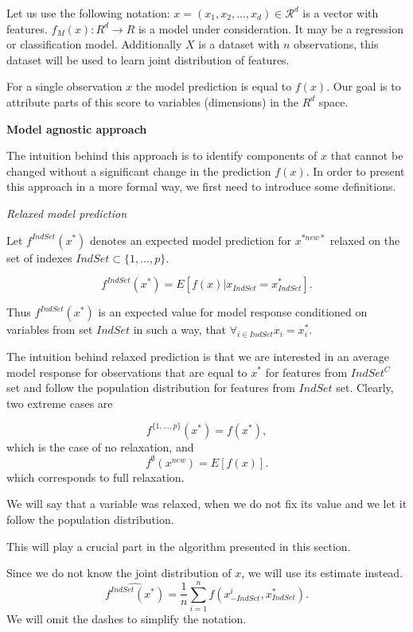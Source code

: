 \documentclass[]{book}
\theoremstyle{definition}
\theoremstyle{definition}
\theoremstyle{definition}
\theoremstyle{remark}
\begin{document}
Let us use the following notation:
\(x = (x_1, x_2, ..., x_d) \in \mathcal R^d\) is a vector with features.
\(f_M(x):R^{d} \rightarrow R\) is a model under consideration. It may be
a regression or classification model. Additionally \(X\) is a dataset
with \(n\) observations, this dataset will be used to learn joint
distribution of features.

For a single observation \(x\) the model prediction is equal to
\(f(x)\). Our goal is to attribute parts of this score to variables
(dimensions) in the \(R^{d}\) space.

\textbf{Model agnostic approach}

The intuition behind this approach is to identify components of \(x\)
that cannot be changed without a significant change in the prediction
\(f(x)\). In order to present this approach in a more formal way, we
first need to introduce some definitions.

\emph{Relaxed model prediction}

Let \(f^{IndSet}(x^{*})\) denotes an expected model prediction for
\(x^{*new*}\) relaxed on the set of indexes
\(IndSet \subset \{1, \ldots, p\}\).

\[
f^{IndSet}(x^{*}) = E[f(x)|x_{IndSet} = x^{*}_{IndSet}].
\]

Thus \(f^{IndSet}(x^{*})\) is an expected value for model response
conditioned on variables from set \(IndSet\) in such a way, that
\(\forall_{i\in IndSet} x_i = x^{*}_i\).

The intuition behind relaxed prediction is that we are interested in an
average model response for observations that are equal to \(x^{*}\) for
features from \(IndSet^C\) set and follow the population distribution
for features from \(IndSet\) set. Clearly, two extreme cases are

\[
f^{\{1, \ldots, p\}}(x^{*}) = f(x^{*}),
\] which is the case of no relaxation, and \[
f^{\emptyset}(x^{new}) = E [f(x)].
\] which corresponds to full relaxation.

We will say that a variable was relaxed, when we do not fix its value
and we let it follow the population distribution.

This will play a crucial part in the algorithm presented in this
section.

Since we do not know the joint distribution of \(x\), we will use its
estimate instead. \[
\widehat {f^{IndSet}(x^{*})} = \frac 1n \sum_{i = 1}^n f(x^i_{-IndSet},x^{*}_{IndSet}).
\] We will omit the dashes to simplify the notation.
\end{document}
